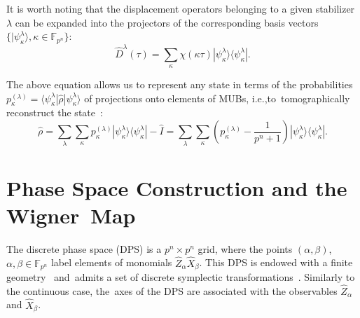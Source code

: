 \documentclass[quantumrep,article,accept,pdftex,moreauthors]{Definitions/mdpi}
\begin{document}
It is worth noting that the displacement operators belonging to a given
stabilizer $\lambda$ can be expanded into the projectors of the corresponding
basis vectors $\{|\psi_{\kappa}^{\lambda}\rangle,\kappa \in
\mathbb{F}_{p^{n}}\}$:
\begin{equation}
  \hat{D}^{\lambda }(\tau )
  = %
   \sum_{\kappa }\chi(\kappa\tau)
  |\psi_{\kappa }^{\lambda }\rangle \langle \psi_{\kappa }^{\lambda }|.
  \label{Dexp}
\end{equation}

The above equation allows us to represent any state in terms of the
probabilities $p_{\kappa}^{(\lambda)} = \langle
\psi_{\kappa}^{\lambda}|\hat{\rho}|\psi_{\kappa}^{\lambda}\rangle$ of
projections onto elements of MUBs, i.e.,to~tomographically reconstruct the state~\cite{gibbons,galvao,cormick,ivanovic,wootters1,DFW12,Durt2006}:
\begin{equation}
  \hat{\rho}
  = \sum_{\lambda}\sum_{\kappa}
  p_{\kappa}^{(\lambda)} |\psi_{\kappa}^{\lambda}\rangle
  \langle \psi_{\kappa}^{\lambda}| - \hat{I}
  = \sum_{\lambda }\sum_{\kappa}\left(
    p_{\kappa }^{(\lambda)}-\frac{1}{p^{n}+1}
  \right)
  |\psi_{\kappa}^{\lambda }\rangle \langle \psi_{\kappa}^{\lambda}|.
  \label{tom r}
\end{equation}


\section{Phase Space Construction and the Wigner~Map\label{sec:3}}

The discrete phase space (DPS) \cite{gibbons,galvao,cormick,wootters1,DFW12} is a
$p^{n} \times p^{n}$ grid, where the points $(\alpha ,\beta )$, $\alpha,\beta
\in \mathbb{F}_{p^{n}}$ label elements of monomials
$\hat{Z}_{\alpha}\hat{X}_{\beta}$. This DPS is endowed with a finite geometry~\cite{gibbons,galvao,cormick,wootters11,DFW12,FF} and~admits a set of discrete
symplectic transformations~\mbox{\cite{DFW2-1,DFW2-2,DFW2-3,DFW2-4,klimov06}}.
Similarly to the continuous case, the~axes of the DPS are associated with the
observables $\hat{Z}_{\alpha}$ and $\hat{X}_{\beta}$.
\end{document}
